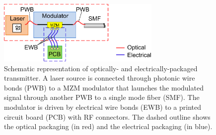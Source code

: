 



\par\medskip
\begin{figure}[!ht]
\centering
  \includegraphics[width=0.7\textwidth]{visio/Schematic_Concept}
  \caption{Schematic representation of optically- and electrically-packaged transmitter. A laser source is connected through photonic wire bonds (PWB) to a MZM modulator that launches the modulated signal through another PWB to a single mode fiber (SMF). The modulator is driven by electrical wire bonds (EWB) to a printed circuit board (PCB) with RF connectors. The dashed outline shows the optical packaging (in red) and the electrical packaging (in blue).}
  \label{fig:SCH_Concept}
\end{figure}

